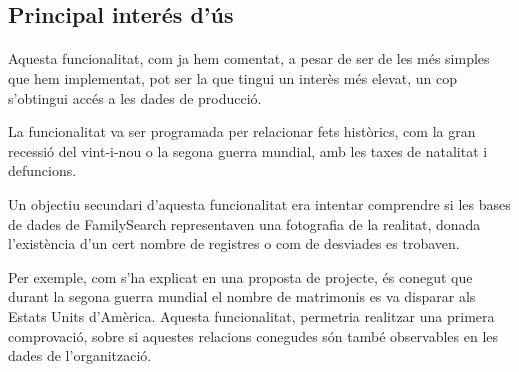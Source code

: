 \subsection{Principal interés d'ús}

    \paragraph{}
    Aquesta funcionalitat, com ja hem comentat, a pesar de ser de les més simples que hem implementat, pot ser la que tingui un interès més elevat, un cop s'obtingui accés a les dades de producció.

    La funcionalitat va ser programada per relacionar fets històrics, com la gran recessió del vint-i-nou o la segona guerra mundial, amb les taxes de natalitat i defuncions.

    Un objectiu secundari d'aquesta funcionalitat era intentar comprendre si les bases de dades de FamilySearch representaven una fotografia de la realitat, donada l'existència d'un cert nombre de registres o com de desviades es trobaven.

    Per exemple,  com s’ha explicat en una proposta de projecte, és conegut que durant la segona guerra mundial el nombre de matrimonis es va disparar als Estats Units d'Amèrica. Aquesta funcionalitat, permetria realitzar una primera comprovació, sobre si aquestes relacions conegudes són també observables en les dades de l'organització.
